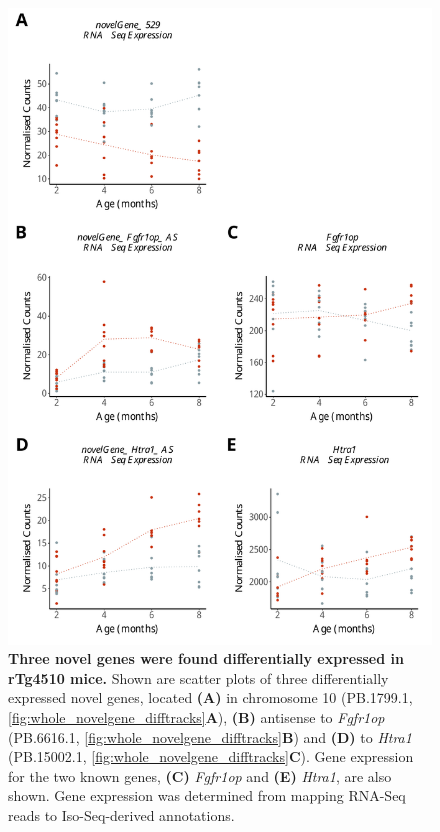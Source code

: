 \begin{figure}[!htp]
	\begin{center}
		\includegraphics[page=1,scale = 0.55]{Figures/NovelGeneExp.pdf}
	\end{center}
	\captionsetup{width=0.95\textwidth}
	\caption[Differentially expressed novel genes associated with progressive tau pathology]%
	{\textbf{Three novel genes were found differentially expressed in rTg4510 mice.} Shown are scatter plots of three differentially expressed novel genes, located \textbf{(A)} in chromosome 10 (PB.1799.1, \cref{fig:whole_novelgene_difftracks}\textbf{A}), \textbf{(B)} antisense to \textit{Fgfr1op} (PB.6616.1, \cref{fig:whole_novelgene_difftracks}\textbf{B}) and \textbf{(D)} to \textit{Htra1} (PB.15002.1, \cref{fig:whole_novelgene_difftracks}\textbf{C}). Gene expression for the two known genes, \textbf{(C)} \textit{Fgfr1op} and \textbf{(E)} \textit{Htra1}, are also shown. Gene expression was determined from mapping RNA-Seq reads to Iso-Seq-derived annotations.}   
	\label{fig:whole_novelgene_diffexp}
\end{figure}

